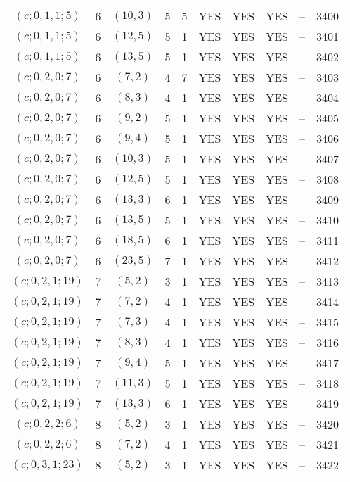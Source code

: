 \begin{longtable}{|c|c|c|c|c|c|c|c|c|c|}
$(c; 0, 1, 1; 5)$ & 6 & $(10, 3)$ & 5 & 5 & YES & YES & YES & -- & 3400\\
$(c; 0, 1, 1; 5)$ & 6 & $(12, 5)$ & 5 & 1 & YES & YES & YES & -- & 3401\\
$(c; 0, 1, 1; 5)$ & 6 & $(13, 5)$ & 5 & 1 & YES & YES & YES & -- & 3402\\
$(c; 0, 2, 0; 7)$ & 6 & $(7, 2)$ & 4 & 7 & YES & YES & YES & -- & 3403\\
$(c; 0, 2, 0; 7)$ & 6 & $(8, 3)$ & 4 & 1 & YES & YES & YES & -- & 3404\\
$(c; 0, 2, 0; 7)$ & 6 & $(9, 2)$ & 5 & 1 & YES & YES & YES & -- & 3405\\
$(c; 0, 2, 0; 7)$ & 6 & $(9, 4)$ & 5 & 1 & YES & YES & YES & -- & 3406\\
$(c; 0, 2, 0; 7)$ & 6 & $(10, 3)$ & 5 & 1 & YES & YES & YES & -- & 3407\\
$(c; 0, 2, 0; 7)$ & 6 & $(12, 5)$ & 5 & 1 & YES & YES & YES & -- & 3408\\
$(c; 0, 2, 0; 7)$ & 6 & $(13, 3)$ & 6 & 1 & YES & YES & YES & -- & 3409\\
$(c; 0, 2, 0; 7)$ & 6 & $(13, 5)$ & 5 & 1 & YES & YES & YES & -- & 3410\\
$(c; 0, 2, 0; 7)$ & 6 & $(18, 5)$ & 6 & 1 & YES & YES & YES & -- & 3411\\
$(c; 0, 2, 0; 7)$ & 6 & $(23, 5)$ & 7 & 1 & YES & YES & YES & -- & 3412\\
$(c; 0, 2, 1; 19)$ & 7 & $(5, 2)$ & 3 & 1 & YES & YES & YES & -- & 3413\\
$(c; 0, 2, 1; 19)$ & 7 & $(7, 2)$ & 4 & 1 & YES & YES & YES & -- & 3414\\
$(c; 0, 2, 1; 19)$ & 7 & $(7, 3)$ & 4 & 1 & YES & YES & YES & -- & 3415\\
$(c; 0, 2, 1; 19)$ & 7 & $(8, 3)$ & 4 & 1 & YES & YES & YES & -- & 3416\\
$(c; 0, 2, 1; 19)$ & 7 & $(9, 4)$ & 5 & 1 & YES & YES & YES & -- & 3417\\
$(c; 0, 2, 1; 19)$ & 7 & $(11, 3)$ & 5 & 1 & YES & YES & YES & -- & 3418\\
$(c; 0, 2, 1; 19)$ & 7 & $(13, 3)$ & 6 & 1 & YES & YES & YES & -- & 3419\\
$(c; 0, 2, 2; 6)$ & 8 & $(5, 2)$ & 3 & 1 & YES & YES & YES & -- & 3420\\
$(c; 0, 2, 2; 6)$ & 8 & $(7, 2)$ & 4 & 1 & YES & YES & YES & -- & 3421\\
$(c; 0, 3, 1; 23)$ & 8 & $(5, 2)$ & 3 & 1 & YES & YES & YES & -- & 3422\\

\end{longtable}
